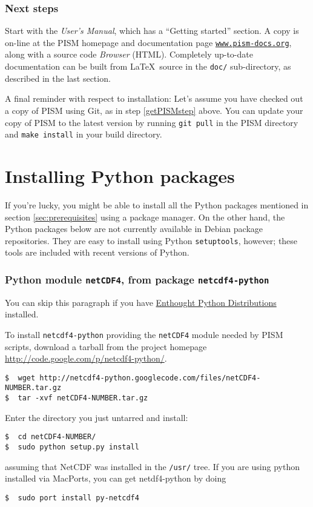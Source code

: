 \documentclass[titlepage,letterpaper,final]{scrartcl}
\begin{document}
\subsubsection*{Next steps}

Start with the \emph{User's Manual}, which has a ``Getting started'' section. A
copy is on-line at the PISM homepage and documentation page
\href{http://www.pism-docs.org/}{\texttt{www.pism-docs.org}}, along with a
source code \emph{Browser} (HTML). Completely up-to-date documentation can be
built from \LaTeX~source in the \texttt{doc/} sub-directory, as described in
the last section.

A final reminder with respect to installation: Let's assume you have checked
out a copy of PISM using Git, as in step \ref{getPISMstep} above. You can
update your copy of PISM to the latest version by running \texttt{git pull} in
the PISM directory and \texttt{make install} in your build directory.


\section{Installing Python packages}
\label{sec:python}

If you're lucky, you might be able to install all the Python packages mentioned
in section \ref{sec:prerequisites} using a package manager. On the other hand,
the Python packages below are not currently available in Debian package
repositories. They are easy to install using Python \texttt{setuptools},
however; these tools are included with recent versions of Python.

\subsubsection*{Python module \texttt{netCDF4}, from package
  \texttt{netcdf4-python}}

You can skip this paragraph if you have
\href{http://www.enthought.com/}{Enthought Python Distributions} installed.

To install \texttt{netcdf4-python} providing the \texttt{netCDF4} module needed
by PISM scripts, download a tarball from the project homepage
\url{http://code.google.com/p/netcdf4-python/}.

\begin{verbatim}
$  wget http://netcdf4-python.googlecode.com/files/netCDF4-NUMBER.tar.gz
$  tar -xvf netCDF4-NUMBER.tar.gz
\end{verbatim}
Enter the directory you just untarred and install:
\begin{verbatim}
$  cd netCDF4-NUMBER/
$  sudo python setup.py install
\end{verbatim}
assuming that NetCDF was installed in the \texttt{/usr/} tree. If you
are using python installed via MacPorts, you can get netdf4-python by doing
\begin{verbatim}
$  sudo port install py-netcdf4
\end{verbatim}
\end{document}
